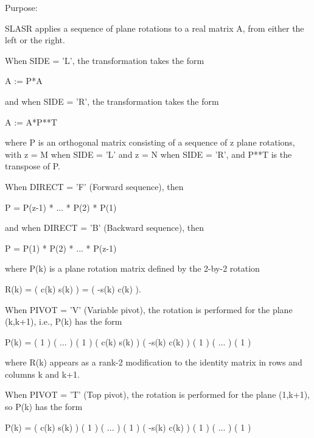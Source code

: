  \begin{DoxyParagraph}{Purpose\+: }
\begin{DoxyVerb} SLASR applies a sequence of plane rotations to a real matrix A,
 from either the left or the right.
 
 When SIDE = 'L', the transformation takes the form
 
    A := P*A
 
 and when SIDE = 'R', the transformation takes the form
 
    A := A*P**T
 
 where P is an orthogonal matrix consisting of a sequence of z plane
 rotations, with z = M when SIDE = 'L' and z = N when SIDE = 'R',
 and P**T is the transpose of P.
 
 When DIRECT = 'F' (Forward sequence), then
 
    P = P(z-1) * ... * P(2) * P(1)
 
 and when DIRECT = 'B' (Backward sequence), then
 
    P = P(1) * P(2) * ... * P(z-1)
 
 where P(k) is a plane rotation matrix defined by the 2-by-2 rotation
 
    R(k) = (  c(k)  s(k) )
         = ( -s(k)  c(k) ).
 
 When PIVOT = 'V' (Variable pivot), the rotation is performed
 for the plane (k,k+1), i.e., P(k) has the form
 
    P(k) = (  1                                            )
           (       ...                                     )
           (              1                                )
           (                   c(k)  s(k)                  )
           (                  -s(k)  c(k)                  )
           (                                1              )
           (                                     ...       )
           (                                            1  )
 
 where R(k) appears as a rank-2 modification to the identity matrix in
 rows and columns k and k+1.
 
 When PIVOT = 'T' (Top pivot), the rotation is performed for the
 plane (1,k+1), so P(k) has the form
 
    P(k) = (  c(k)                    s(k)                 )
           (         1                                     )
           (              ...                              )
           (                     1                         )
           ( -s(k)                    c(k)                 )
           (                                 1             )
           (                                      ...      )
           (                                             1 )
 

\end{DoxyVerb}
\end{DoxyParagraph}

